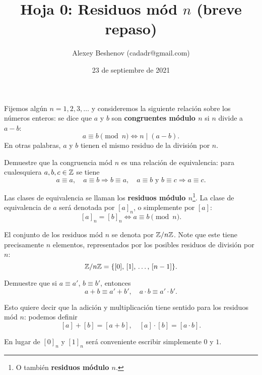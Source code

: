 \documentclass{article}
\title{Hoja 0: Residuos mód $n$ (breve repaso)}
\author{Alexey Beshenov (cadadr@gmail.com)}
\date{23 de septiembre de 2021}
\begin{document}
\maketitle

\setcounter{section}{2}

\begin{definicion}
  Fijemos algún $n = 1,2,3,\ldots$ y consideremos la siguiente relación sobre
  los números enteros: se dice que $a$ y $b$ son \textbf{congruentes módulo $n$}
  si $n$ divide a $a-b$:
  $$a \equiv b \pmod{n} \iff n \mid (a-b).$$
  En otras palabras, $a$ y $b$ tienen el mismo residuo de la división por $n$.
\end{definicion}

\begin{problema}
  Demuestre que la congruencia mód $n$ es una relación de equivalencia:
  para cualesquiera $a,b,c\in \mathbb{Z}$ se tiene
  \[
    a\equiv a, \quad
    a\equiv b \Rightarrow b\equiv a, \quad
    a\equiv b \text{ y } b\equiv c \Rightarrow a\equiv c.
  \]
\end{problema}

\begin{definicion}
  Las clases de equivalencia se llaman los \textbf{residuos módulo
    $n$}\footnote{O también \textbf{residuos módulo $n$}.}. La clase de
  equivalencia de $a$ será denotada por $[a]_n$, o simplemente por $[a]$:
  $$[a]_n = [b]_n \iff a\equiv b \pmod{n}.$$
  
  El conjunto de los residuos mód $n$ se denota por $\mathbb{Z}/n\mathbb{Z}$. Note que este
  tiene precisamente $n$ elementos, representados por los posibles residuos de
  división por $n$:
  $$\mathbb{Z}/n\mathbb{Z} = \{ [0], \, [1], \, \ldots, \, [n-1] \}.$$
\end{definicion}

\begin{problema}
  Demuestre que si $a \equiv a'$, $b \equiv b'$, entonces
  \[ a+b \equiv a'+b', \quad a\cdot b \equiv a'\cdot b'. \]

  Esto quiere decir que la adición y multiplicación tiene sentido para los
  residuos mód $n$: podemos definir
  \[ [a] + [b] = [a+b], \quad [a]\cdot [b] = [a\cdot b]. \]
\end{problema}

En lugar de $[0]_n$ y $[1]_n$ será conveniente escribir simplemente $0$ y $1$.
\end{document}
